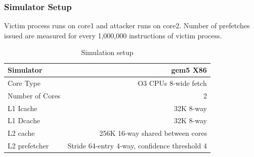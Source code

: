 \documentclass[10pt,usenames,dvipsnames]{beamer}
\begin{document}

\begin{frame}[fragile]
\frametitle{Simulator Setup}

Victim process runs on core1 and attacker runs on core2. Number of prefetches
issued are measured for every 1,000,000 instructions of victim process.\\
\vspace{0.1in}
\begin{table}[hbp]
\centering
\begin{tabular}{|l|r|}
    \hline
    Simulator  & gem5 X86\\
    \hline
    Core Type  & O3 CPUs 8-wide fetch\\
    \hline
    Number of Cores & 2\\
    \hline
    L1 Icache & 32K 8-way\\
    \hline
    L1 Dcache & 32K 8-way\\
    \hline
    L2 cache & 256K 16-way shared between cores\\
    \hline
    L2 prefetcher  & Stride 64-entry 4-way, confidence threshold 4\\
    \hline
\end{tabular}
\\
\caption{Simulation setup}
\label{tab:simulation_setup}
\end{table}
\end{frame}
\end{document}
